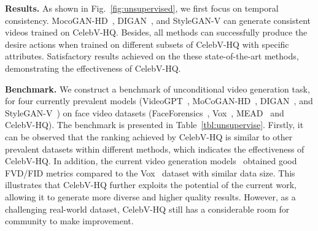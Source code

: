 \documentclass[runningheads]{llncs}
\begin{document}
\noindent
\textbf{Results.}
As shown in Fig.~\ref{fig:unsupervised}, we first focus on temporal consistency. MocoGAN-HD~\cite{mocoganhd}, DIGAN~\cite{digan}, and StyleGAN-V\cite{styleganv} can generate consistent videos trained on CelebV-HQ.
Besides, all methods can successfully produce the desire actions when trained on different subsets of CelebV-HQ with specific attributes. 
Satisfactory results achieved on the these state-of-the-art methods, demonstrating the effectiveness of CelebV-HQ. 



\noindent
\textbf{Benchmark.}
We construct a benchmark of unconditional video generation task, for four currently prevalent models (VideoGPT~\cite{yan2021videogpt}, MoCoGAN-HD~\cite{mocoganhd}, DIGAN~\cite{digan}, and StyleGAN-V~\cite{styleganv}) on  face video datasets (FaceForensics~\cite{faceforensics}, Vox~\cite{vox17}, MEAD~\cite{mead} and CelebV-HQ). 
The benchmark is presented in Table~\ref{tbl:unsupervise}. 
Firstly, it can be observed that the ranking achieved by CelebV-HQ is similar to other prevalent datasets within different methods, which indicates the effectiveness of CelebV-HQ. 
In addition, the current video generation models~\cite{yan2021videogpt,mocoganhd,digan,styleganv} obtained good FVD/FID metrics compared to the Vox~\cite{vox17} dataset with similar data size. This illustrates that CelebV-HQ further exploits the potential of the current work, allowing it to generate more diverse and higher quality results.
However, as a challenging real-world dataset, CelebV-HQ still has a considerable room for community to make improvement.
\end{document}
